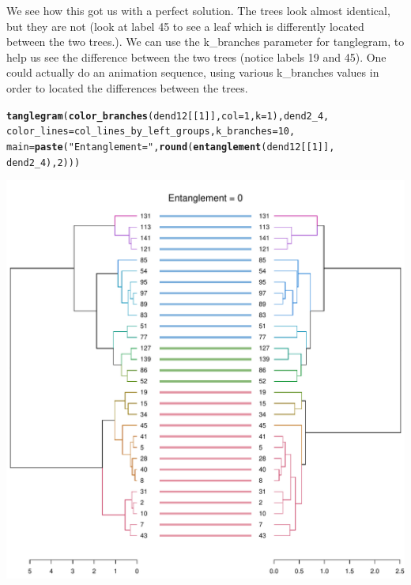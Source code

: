\documentclass[shortnames,nojss,article]{jss}\usepackage[]{graphicx}\usepackage[]{color}
\makeatletter
\def\maxwidth{ %
  \ifdim\Gin@nat@width>\linewidth
    \linewidth
  \else
    \Gin@nat@width
  \fi
}
\newcommand{\hlnum}[1]{\textcolor[rgb]{0.686,0.059,0.569}{#1}}%
\newcommand{\hlstr}[1]{\textcolor[rgb]{0.192,0.494,0.8}{#1}}%
\newcommand{\hlstd}[1]{\textcolor[rgb]{0.345,0.345,0.345}{#1}}%
\newcommand{\hlkwc}[1]{\textcolor[rgb]{0.333,0.667,0.333}{#1}}%
\newcommand{\hlkwd}[1]{\textcolor[rgb]{0.737,0.353,0.396}{\textbf{#1}}}%
\newenvironment{kframe}{%
 \def\at@end@of@kframe{}%
 \ifinner\ifhmode%
  \def\at@end@of@kframe{\end{minipage}}%
  \begin{minipage}{\columnwidth}%
 \fi\fi%
 \def\FrameCommand##1{\hskip\@totalleftmargin \hskip-\fboxsep
 \colorbox{shadecolor}{##1}\hskip-\fboxsep
     \hskip-\linewidth \hskip-\@totalleftmargin \hskip\columnwidth}%
 \MakeFramed {\advance\hsize-\width
   \@totalleftmargin\z@ \linewidth\hsize
   \@setminipage}}%
 {\par\unskip\endMakeFramed%
 \at@end@of@kframe}
\newenvironment{knitrout}{}{} %
\makeatother
\begin{document}
We see how this got us with a perfect solution. The trees look almost identical, but they are not (look at label 45 to see a leaf which is differently located between the two trees.). We can use the k_branches parameter for tanglegram, to help us see the difference between the two trees (notice labels 19 and 45). One could actually do an animation sequence, using various k_branches values in order to located the differences between the trees.

\begin{knitrout}
\color{fgcolor}\begin{kframe}
\begin{alltt}
\hlkwd{tanglegram}\hlstd{(}\hlkwd{color_branches}\hlstd{(dend12[[}\hlnum{1}\hlstd{]],} \hlkwc{col} \hlstd{=} \hlnum{1}\hlstd{,} \hlkwc{k} \hlstd{=} \hlnum{1}\hlstd{), dend2_4,}
    \hlkwc{color_lines} \hlstd{= col_lines_by_left_groups,} \hlkwc{k_branches} \hlstd{=} \hlnum{10}\hlstd{,}
    \hlkwc{main} \hlstd{=} \hlkwd{paste}\hlstd{(}\hlstr{"Entanglement ="}\hlstd{,} \hlkwd{round}\hlstd{(}\hlkwd{entanglement}\hlstd{(dend12[[}\hlnum{1}\hlstd{]],}
        \hlstd{dend2_4),} \hlnum{2}\hlstd{)))}
\end{alltt}
\end{kframe}

{\centering \includegraphics[width=\maxwidth]{figure/unnamed-chunk-39} 

}



\end{knitrout}
\end{document}
